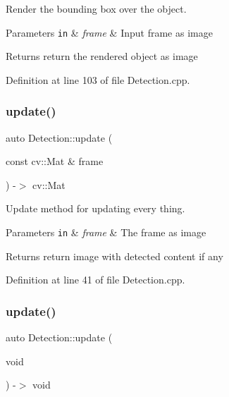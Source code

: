 Render the bounding box over the object. 


\begin{DoxyParams}[1]{Parameters}
\mbox{\tt in}  & {\em frame} & Input frame as image\\
\hline
\end{DoxyParams}
\begin{DoxyReturn}{Returns}
return the rendered object as image 
\end{DoxyReturn}


Definition at line 103 of file Detection.\+cpp.

\mbox{\label{class_detection_a7ec75616ce302825816a0ee350452ef8}} 
\subsubsection{\texorpdfstring{update()}{update()}\hspace{0.1cm}{\footnotesize\ttfamily [1/2]}}
{\footnotesize\ttfamily auto Detection\+::update (\begin{DoxyParamCaption}\item[{const cv\+::\+Mat \&}]{frame }\end{DoxyParamCaption}) -\/$>$ cv\+::\+Mat}



Update method for updating every thing. 


\begin{DoxyParams}[1]{Parameters}
\mbox{\tt in}  & {\em frame} & The frame as image\\
\hline
\end{DoxyParams}
\begin{DoxyReturn}{Returns}
return image with detected content if any 
\end{DoxyReturn}


Definition at line 41 of file Detection.\+cpp.

\mbox{\label{class_detection_a5a959a3e87c5cfba1ae5a78429df6b5c}} 
\subsubsection{\texorpdfstring{update()}{update()}\hspace{0.1cm}{\footnotesize\ttfamily [2/2]}}
{\footnotesize\ttfamily auto Detection\+::update (\begin{DoxyParamCaption}\item[{void}]{ }\end{DoxyParamCaption}) -\/$>$ void\hspace{0.3cm}{\ttfamily [virtual]}}



